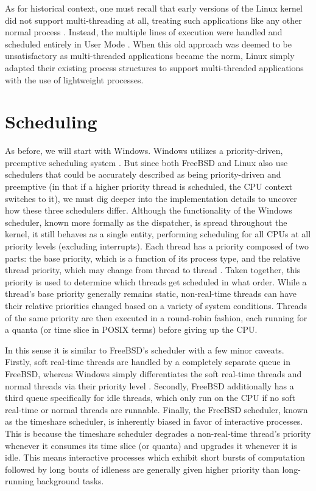 \documentclass[onecolumn, draftclsnofoot,10pt, compsoc]{IEEEtran}
\begin{document}
As for historical context, one must recall that early versions of the Linux kernel did not support multi-threading at all, treating such applications like any other normal process \cite{LinuxKernel}. Instead, the multiple lines of execution were handled and scheduled entirely in User Mode \cite{LinuxKernel}. When this old approach was deemed to be unsatisfactory as multi-threaded applications became the norm, Linux simply adapted their existing process structures to support multi-threaded applications with the use of lightweight processes.
\section{Scheduling}
As before, we will start with Windows. Windows utilizes a priority-driven, preemptive scheduling system \cite{WindowsInternals}. But since both FreeBSD and Linux also use schedulers that could be accurately described as being priority-driven and preemptive (in that if a higher priority thread is scheduled, the CPU context switches to it), we must dig deeper into the implementation details to uncover how these three schedulers differ. Although the functionality of the Windows scheduler, known more formally as the dispatcher, is spread throughout the kernel, it still behaves as a single entity, performing scheduling for all CPUs at all priority levels (excluding interrupts). Each thread has a priority composed of two parts: the base priority, which is a function of its process type, and the relative thread priority, which may change from thread to thread \cite{WindowsInternals}. Taken together, this priority is used to determine which threads get scheduled in what order. While a thread's base priority generally remains static, non-real-time threads can have their relative priorities changed based on a variety of system conditions. Threads of the same priority are then executed in a round-robin fashion, each running for a quanta (or time slice in POSIX terms) before giving up the CPU. 

In this sense it is similar to FreeBSD's scheduler with a few minor caveats. Firstly, soft real-time threads are handled by a completely separate queue in FreeBSD, whereas Windows simply differentiates the soft real-time threads and normal threads via their priority level \cite{FreeBSD}. Secondly, FreeBSD additionally has a third queue specifically for idle threads, which only run on the CPU if no soft real-time or normal threads are runnable. Finally, the FreeBSD scheduler, known as the timeshare scheduler, is inherently biased in favor of interactive processes. This is because the timeshare scheduler degrades a non-real-time thread's priority whenever it consumes its time slice (or quanta) and upgrades it whenever it is idle. This means interactive processes which exhibit short bursts of computation followed by long bouts of idleness are generally given higher priority than long-running background tasks.
\end{document}
